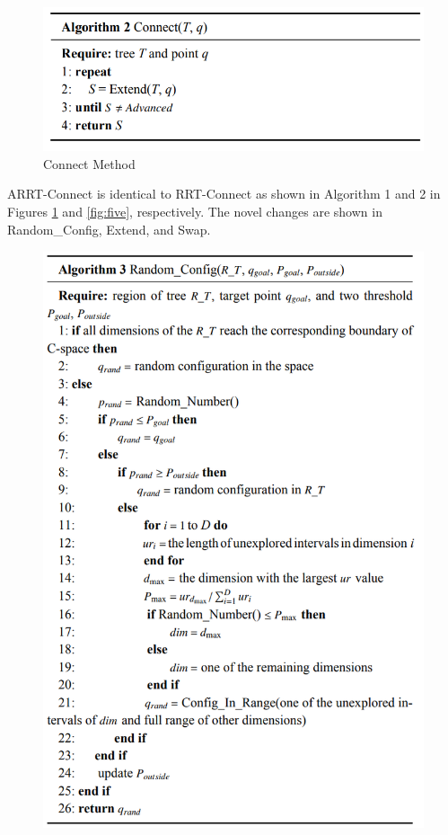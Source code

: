 \documentclass[conference]{IEEEtran}
\begin{document}

\begin{figure}[!t]
  \centering
  \includegraphics[width=\linewidth]{algorithm2}  %
  \caption{Connect Method}
  \label{fig:three}
\end{figure}

ARRT-Connect is identical to RRT-Connect as shown in Algorithm 1 and 2 in Figures \ref{fig:three} and \ref{fig:five}, respectively. The novel changes are shown in Random\_Config, Extend, and Swap.




\begin{figure}[!t]
  \centering
  \includegraphics[width=\linewidth]{algorithm3}  %
  \caption{}
  \label{fig:four}
\end{figure}
\end{document}

